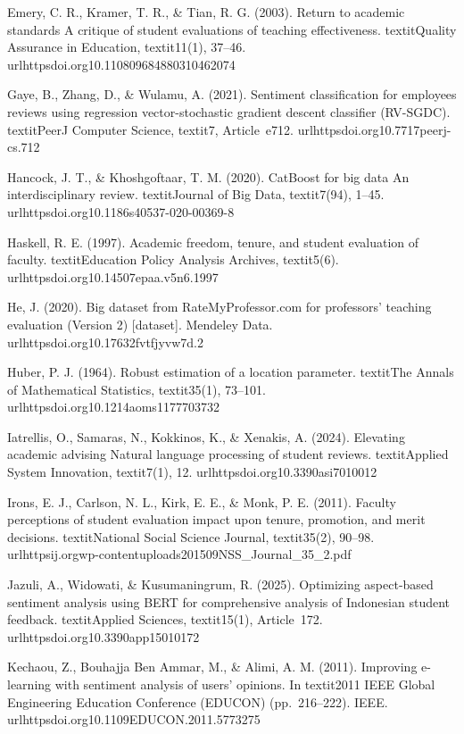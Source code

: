 Emery, C. R., Kramer, T. R., & Tian, R. G. (2003). Return to academic standards A critique of student evaluations of teaching effectiveness. textit{Quality Assurance in Education}, textit{11}(1), 37--46. url{httpsdoi.org10.110809684880310462074}

Gaye, B., Zhang, D., & Wulamu, A. (2021). Sentiment classification for employees reviews using regression vector-stochastic gradient descent classifier (RV-SGDC). textit{PeerJ Computer Science}, textit{7}, Article~e712. url{httpsdoi.org10.7717peerj-cs.712}

Hancock, J. T., & Khoshgoftaar, T. M. (2020). CatBoost for big data An interdisciplinary review. textit{Journal of Big Data}, textit{7}(94), 1--45. url{httpsdoi.org10.1186s40537-020-00369-8}

Haskell, R. E. (1997). Academic freedom, tenure, and student evaluation of faculty. textit{Education Policy Analysis Archives}, textit{5}(6). url{httpsdoi.org10.14507epaa.v5n6.1997}

He, J. (2020). Big dataset from RateMyProfessor.com for professors' teaching evaluation (Version 2) [dataset]. Mendeley Data. url{httpsdoi.org10.17632fvtfjyvw7d.2}

Huber, P. J. (1964). Robust estimation of a location parameter. textit{The Annals of Mathematical Statistics}, textit{35}(1), 73--101. url{httpsdoi.org10.1214aoms1177703732}

Iatrellis, O., Samaras, N., Kokkinos, K., & Xenakis, A. (2024). Elevating academic advising Natural language processing of student reviews. textit{Applied System Innovation}, textit{7}(1), 12. url{httpsdoi.org10.3390asi7010012}

Irons, E. J., Carlson, N. L., Kirk, E. E., & Monk, P. E. (2011). Faculty perceptions of student evaluation impact upon tenure, promotion, and merit decisions. textit{National Social Science Journal}, textit{35}(2), 90--98. url{httpsij.orgwp-contentuploads201509NSS_Journal_35_2.pdf} 

Jazuli, A., Widowati, & Kusumaningrum, R. (2025). Optimizing aspect-based sentiment analysis using BERT for comprehensive analysis of Indonesian student feedback. textit{Applied Sciences}, textit{15}(1), Article~172. url{httpsdoi.org10.3390app15010172}

Kechaou, Z., Bouhajja Ben Ammar, M., & Alimi, A. M. (2011). Improving e-learning with sentiment analysis of users' opinions. In textit{2011 IEEE Global Engineering Education Conference (EDUCON)} (pp.~216--222). IEEE. url{httpsdoi.org10.1109EDUCON.2011.5773275}

